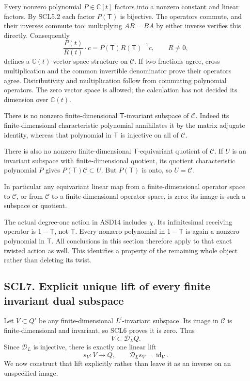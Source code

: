 Every nonzero polynomial \(P\in\mathbb C[t]\) factors into a nonzero
constant and linear factors. By SCL5.2 each factor \(P(\mathsf T)\) is
bijective. The operators commute, and their inverses commute too:
multiplying \(AB=BA\) by either inverse verifies this directly.
Consequently \[
 \frac{P(t)}{R(t)}\cdot c
   =P(\mathsf T)R(\mathsf T)^{-1}c,\qquad R\ne0,
 \tag{SCL6.1}
\] defines a \(\mathbb C(t)\)-vector-space structure on \(\mathscr C\).
If two fractions agree, cross multiplication and the common invertible
denominator prove their operators agree. Distributivity and
multiplication follow from commuting polynomial operators. The zero
vector space is allowed; the calculation has not decided its dimension
over \(\mathbb C(t)\).

There is no nonzero finite-dimensional \(\mathsf T\)-invariant subspace
of \(\mathscr C\). Indeed its finite-dimensional characteristic
polynomial annihilates it by the matrix adjugate identity, whereas that
polynomial in \(\mathsf T\) is injective on all of \(\mathscr C\).

There is also no nonzero finite-dimensional \(\mathsf T\)-equivariant
quotient of \(\mathscr C\). If \(U\) is an invariant subspace with
finite-dimensional quotient, its quotient characteristic polynomial
\(P\) gives \(P(\mathsf T)\mathscr C\subset U\). But \(P(\mathsf T)\) is
onto, so \(U=\mathscr C\).

In particular any equivariant linear map from a finite-dimensional
operator space to \(\mathscr C\), or from \(\mathscr C\) to a
finite-dimensional operator space, is zero: its image is such a subspace
or quotient.

The actual degree-one action in ASD14 includes \(\chi\). Its
infinitesimal receiving operator is \(1-\mathsf T\), not \(\mathsf T\).
Every nonzero polynomial in \(1-\mathsf T\) is again a nonzero
polynomial in \(\mathsf T\). All conclusions in this section therefore
apply to that exact twisted action as well. This identifies a property
of the remaining whole object rather than deleting its twist.

\subsection{SCL7. Explicit unique lift of every finite invariant dual
subspace}\label{scl7.-explicit-unique-lift-of-every-finite-invariant-dual-subspace}

Let \(V\subset Q'\) be any finite-dimensional \(L^t\)-invariant
subspace. Its image in \(\mathscr C\) is finite-dimensional and
invariant, so SCL6 proves it is zero. Thus \[
 V\subset\mathcal D_LQ.
\] Since \(\mathcal D_L\) is injective, there is exactly one linear lift
\[
 s_V:V\to Q,\qquad \mathcal D_Ls_V=\operatorname{id}_V.
 \tag{SCL7.1}
\] We now construct that lift explicitly rather than leave it as an
inverse on an unspecified image.

